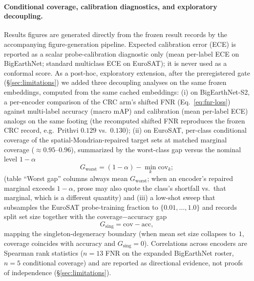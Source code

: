 \documentclass[preprint,11pt,authoryear]{elsarticle}
\begin{document}
\paragraph{Conditional coverage, calibration diagnostics, and exploratory decoupling.}
Results figures are generated directly from the frozen result records by the accompanying figure-generation pipeline. Expected calibration
error (ECE) is reported as a scalar probe-calibration diagnostic only (mean per-label ECE on BigEarthNet;
standard multiclass ECE on EuroSAT); it is never used as a conformal score. As a post-hoc, exploratory
extension, after the preregistered gate (\S\ref{sec:limitations}) we added three decoupling analyses on the
same frozen embeddings, computed
from the same cached embeddings: (i) on BigEarthNet-S2, a per-encoder comparison of the CRC
arm's shifted FNR (Eq.~\eqref{eq:fnr-loss}) against multi-label accuracy (macro mAP) and calibration (mean
per-label ECE) analogs on the same footing (the recomputed shifted FNR reproduces the frozen CRC record, e.g.\
Prithvi $0.129$ vs.\ $0.130$); (ii) on EuroSAT, per-class conditional coverage of the
spatial-Mondrian-repaired target sets at matched marginal coverage ($\approx0.95$--$0.96$), summarized by
the worst-class gap versus the nominal level $1-\alpha$
\begin{equation}
\label{eq:worst-class-gap}
G_{\mathrm{worst}}
=(1{-}\alpha)-\min_k \mathrm{cov}_k;
\end{equation}
(table ``Worst gap'' columns always mean $G_{\mathrm{worst}}$; when an encoder's repaired
marginal exceeds $1-\alpha$, prose may also quote the class's shortfall vs.\ that marginal, which is a different quantity)
and (iii) a low-shot sweep that subsamples the EuroSAT probe-training fraction to $\{0.01,\dots,1.0\}$ and
records split set size together with the coverage$-$accuracy gap
\begin{equation}
\label{eq:sing-gap}
G_{\mathrm{sing}}
=\mathrm{cov}-\mathrm{acc},
\end{equation}
mapping the singleton-degeneracy boundary (when mean set size collapses to~$1$, coverage coincides with
accuracy and $G_{\mathrm{sing}}=0$).
Correlations across encoders are Spearman rank statistics ($n{=}13$ FNR on the expanded BigEarthNet roster,
$n{=}5$ conditional coverage) and are reported as directional evidence, not proofs of independence
(\S\ref{sec:limitations}).
\end{document}
